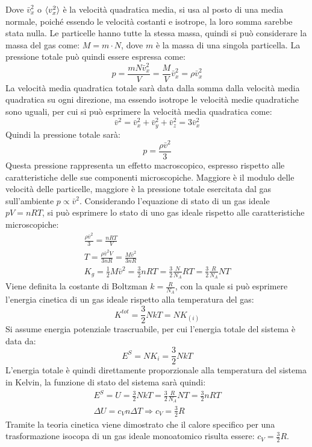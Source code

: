 \documentclass{article}
\numberwithin{equation}{subsection}
\begin{document}
Dove $\bar{v}_x^2$ o $\braket{v_x^2}$ è la velocità quadratica 
media, si usa al posto di una media normale, poiché essendo le 
velocità costanti e isotrope, la loro somma sarebbe stata nulla. 
Le particelle hanno tutte la stessa massa, quindi si può 
considerare la massa del gas come: $M=m\cdot N$, dove 
$m$ è la massa di una singola particella.
La pressione totale può quindi essere espressa come:
\begin{equation}
    p=\displaystyle\frac{mN\bar{v}_x^2}{V}=\frac{M}{V}\bar{v}_x^2=\rho\bar{v}_x^2
\end{equation}
La velocità media quadratica totale 
sarà data dalla somma dalla velocità media quadratica su ogni 
direzione, ma essendo isotrope le velocità medie quadratiche 
sono uguali, per cui si può esprimere la velocità media 
quadratica come:
\begin{equation}
    \bar{v}^2=\bar{v}_x^2+\bar{v}_y^2+\bar{v}_z^2=3\bar{v}_x^2
\end{equation}
Quindi la pressione totale sarà:
\begin{equation}
    p=\displaystyle\frac{\rho\bar{v}^2}{3}
\end{equation}
Questa pressione rappresenta un effetto macroscopico, espresso 
rispetto alle caratteristiche delle sue componenti microscopiche. 
Maggiore è il modulo delle velocità delle particelle, maggiore 
è la pressione totale esercitata dal gas sull'ambiente $p\propto\bar v^2$. 
Considerando l'equazione di stato di un gas ideale $pV=nRT$, si può 
esprimere lo stato di uno gas ideale rispetto alle caratteristiche 
microscopiche:
\begin{gather}
    \displaystyle\frac{\rho\bar v^2}{3}=\frac{nRT}{V}\\
    T=\displaystyle\frac{\rho\bar v^2 V}{3nR}=\frac{M\bar v^2}{3nR}\\
    K_g=\displaystyle\frac{1}{2}M\bar v^2=\frac{3}{2}nRT=\frac{3}{2}\frac{N}{N_A}RT=\frac{3}{2}\frac{R}{N_A}NT
\end{gather}
Viene definita la costante di Boltzman $k=\displaystyle\frac{R}{N_A}$, 
con la quale si può esprimere l'energia cinetica di un gas ideale 
rispetto alla temperatura del gas:
\begin{equation}
    K^{tot}=\displaystyle\frac{3}{2}NkT=NK_{(i)}
\end{equation}
Si assume energia potenziale trascruabile, per cui 
l'energia totale del sistema è data da:
\begin{equation}
    E^S=NK_i=\displaystyle\frac{3}{2}NkT
\end{equation}
L'energia totale è quindi direttamente proporzionale alla 
temperatura del sistema in Kelvin, la funzione di stato 
del sistema sarà quindi:
\begin{gather}
    E^S=U=\displaystyle\frac{3}{2}NkT=\frac{3}{2}\frac{R}{N_A}NT=\frac{3}{2}nRT\\
    \Delta U=c_Vn\Delta T\Rightarrow c_V=\displaystyle\frac{3}{2}R
\end{gather}
Tramite la teoria cinetica viene dimostrato che il calore 
specifico per una trasformazione isocopa di un gas ideale 
monoatomico risulta essere: $c_V=\displaystyle\frac{3}{2}R$.
\end{document}
